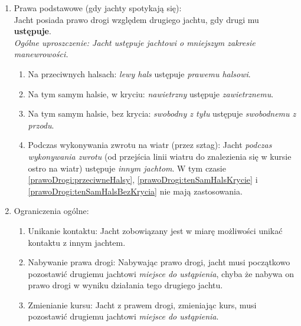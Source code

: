 \documentclass[12pt,a4paper]{article}
\begin{document}
\begin{enumerate}
\begin{enumerate}
        \begin{enumerate}
            \item miejsce na dożeglowanie do znaku, gdy kursem właściwym jachtu jest żeglowanie blisko niego,
            \item miejsce do okrążenia lub minięcia znaku konieczne do przebycia trasy bez dotykania znaku.
        \end{enumerate}
    \end{enumerate}
    \item Prawa podstawowe (gdy jachty spotykają się):\\
    Jacht posiada prawo drogi względem drugiego jachtu, gdy drugi mu \textbf{ustępuje}.\\
    \textit{Ogólne uproszczenie: Jacht ustępuje jachtowi o {mniejszym zakresie manewrowości}.}
    \begin{enumerate}
        \item Na przeciwnych halsach: \textit{lewy hals} ustępuje \textit{prawemu halsowi}.
        \label{prawoDrogi:przeciwneHalsy}
        \item Na tym samym halsie, w kryciu: \textit{nawietrzny} ustępuje \textit{zawietrznemu}.
        \label{prawoDrogi:tenSamHalsKrycie}
        \item Na tym samym halsie, bez krycia: \textit{swobodny z tyłu} ustępuje \textit{swobodnemu z przodu}.
        \label{prawoDrogi:tenSamHalsBezKrycia}
        \item Podczas wykonywania zwrotu na wiatr (przez sztag): Jacht \textit{podczas wykonywania zwrotu} (od przejścia linii wiatru do znalezienia się w kursie ostro na wiatr) ustępuje \textit{innym jachtom}. W tym czasie \ref{prawoDrogi:przeciwneHalsy}, \ref{prawoDrogi:tenSamHalsKrycie} i \ref{prawoDrogi:tenSamHalsBezKrycia} nie mają zastosowania.
        \label{prawoDrogi:podczasZwrotuNaWiatr}
    \end{enumerate}
    \item Ograniczenia ogólne:
    \begin{enumerate}
        \item Unikanie kontaktu: Jacht zobowiązany jest w miarę możliwości unikać kontaktu z innym jachtem.
        \item Nabywanie prawa drogi: Nabywając prawo drogi, jacht musi początkowo pozostawić drugiemu jachtowi \textit{miejsce do ustąpienia}, chyba że nabywa on prawo drogi w wyniku działania tego drugiego jachtu.
        \item Zmienianie kursu: Jacht z prawem drogi, zmieniając kurs, musi pozostawić drugiemu jachtowi \textit{miejsce do ustąpienia}.

\end{enumerate}
\end{enumerate}
\end{document}
